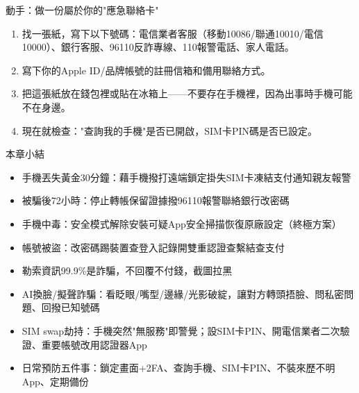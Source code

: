 \begin{tcbpractice}{動手：做一份屬於你的"應急聯絡卡"}
\begin{enumerate}
  \item 找一張紙，寫下以下號碼：電信業者客服（移動10086/聯通10010/電信10000）、銀行客服、96110反詐專線、110報警電話、家人電話。
  \item 寫下你的Apple ID/品牌帳號的註冊信箱和備用聯絡方式。
  \item 把這張紙放在錢包裡或貼在冰箱上——不要存在手機裡，因為出事時手機可能不在身邊。
  \item 現在就檢查："查詢我的手機"是否已開啟，SIM卡PIN碼是否已設定。
\end{enumerate}

\end{tcbpractice}

\begin{tcbsummary}{本章小結}
\begin{itemize}
  \item 手機丟失黃金30分鐘：藉手機撥打遠端鎖定掛失SIM卡凍結支付通知親友報警
  \item 被騙後72小時：停止轉帳保留證據撥96110報警聯絡銀行改密碼
  \item 手機中毒：安全模式解除安裝可疑App安全掃描恢復原廠設定（終極方案）
  \item 帳號被盜：改密碼踢裝置查登入記錄開雙重認證查繫結查支付
  \item 勒索資訊99.9\%是詐騙，不回覆不付錢，截圖拉黑
  \item AI換臉/擬聲詐騙：看眨眼/嘴型/邊緣/光影破綻，讓對方轉頭捂臉、問私密問題、回撥已知號碼
  \item SIM swap劫持：手機突然"無服務"即警覺；設SIM卡PIN、開電信業者二次驗證、重要帳號改用認證器App
  \item 日常預防五件事：鎖定畫面+2FA、查詢手機、SIM卡PIN、不裝來歷不明App、定期備份
\end{itemize}

\end{tcbsummary}
